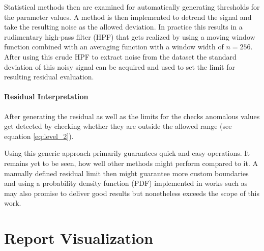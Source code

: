 Statistical methods then are examined for automatically generating thresholds for the parameter values. A method is then implemented to detrend the signal and take the resulting noise as the allowed deviation. In practice this results in a rudimentary high-pass filter (HPF) that gets realized by using a moving window function combined with an averaging function with a window width of $n=256$. After using this crude HPF to extract noise from the dataset the standard deviation of this noisy signal can be acquired and used to set the limit for resulting residual evaluation.


\paragraph{Residual Interpretation}

After generating the residual as well as the limits for the checks anomalous values get detected by checking whether they are outside the allowed range (see equation \ref{eq:level_2}).

Using this generic approach primarily guarantees quick and easy operations. It remains yet to be seen, how well other methods might perform compared to it. A manually defined residual limit then might guarantee more custom boundaries and using a probability density function (PDF) implemented in works such as \cite{svard_data-driven_2014} may also promise to deliver good results but nonetheless exceeds the scope of this work.



\newpage


\section{Report Visualization}
\label{chap:4-visualization}

